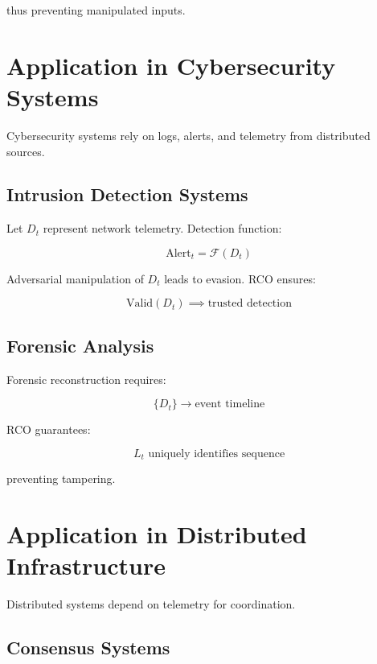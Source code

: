 thus preventing manipulated inputs.

\section{Application in Cybersecurity Systems}

Cybersecurity systems rely on logs, alerts, and telemetry from distributed sources.

\subsection{Intrusion Detection Systems}

Let $D_t$ represent network telemetry. Detection function:

\begin{equation}
\text{Alert}_t = \mathcal{F}(D_t)
\end{equation}

Adversarial manipulation of $D_t$ leads to evasion. RCO ensures:

\begin{equation}
\text{Valid}(D_t) \implies \text{trusted detection}
\end{equation}

\subsection{Forensic Analysis}

Forensic reconstruction requires:

\begin{equation}
\{D_t\} \rightarrow \text{event timeline}
\end{equation}

RCO guarantees:

\begin{equation}
L_t \text{ uniquely identifies sequence}
\end{equation}

preventing tampering.

\section{Application in Distributed Infrastructure}

Distributed systems depend on telemetry for coordination.

\subsection{Consensus Systems}

